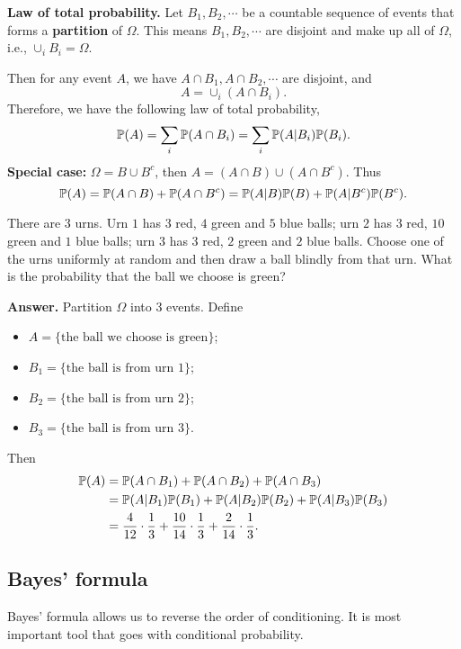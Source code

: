   
  \textbf{Law of total probability.} Let $B_1, B_2,\cdots$ be a countable
  sequence of events that forms a \textbf{partition} of $\Omega$. This means
  $B_1,B_2,\cdots$ are disjoint and make up all of $\Omega$, i.e., $\cup_iB_i = \Omega$.

  Then for any event $A$, we have $A\cap B_1, A\cap B_2,\cdots$ are disjoint,
  and
  \[
    A = \cup_i(A\cap B_i).
  \]
  Therefore, we have the following law of total probability,
  \[
    \mathbb{P}(A) = \sum_i \mathbb{P}(A\cap B_i) = \sum_i \mathbb{P}(A| B_i) \mathbb{P}(B_i).
  \]
  \textbf{Special case:} $\Omega = B\cup B^c$, then $A = (A\cap B) \cup (A\cap
  B^c)$. Thus
  \[
    \mathbb{P}(A) = \mathbb{P}(A\cap B) + \mathbb{P}(A\cap B^c) = \mathbb{P}(A|B)\mathbb{P}(B) + \mathbb{P}(A|B^c)\mathbb{P}(B^c).
  \]
  \begin{example}
    There are $3$ urns. Urn $1$ has $3$ red, $4$ green and $5$ blue balls; urn
    $2$ has $3$ red, $10$ green and $1$ blue balls; urn $3$ has $3$ red, $2$
    green and $2$ blue balls. Choose one of the urns uniformly at random and
    then draw a ball blindly from that urn. What is the probability that the
    ball we choose is green?
  \end{example}
  \textbf{Answer.} Partition $\Omega$ into $3$ events. Define
  \begin{itemize}
  \item $A = \{\text{the ball we choose is green}\}$;
  \item $B_1 = \{\text{the ball is from urn $1$}\}$;
  \item $B_2 = \{\text{the ball is from urn $2$}\}$;
  \item $B_3 = \{\text{the ball is from urn $3$}\}$.
  \end{itemize}
  Then
  \begin{align*}
    \mathbb{P}(A) & = \mathbb{P}(A\cap B_1) + \mathbb{P}(A\cap B_2) + \mathbb{P}(A\cap B_3)\\
           & = \mathbb{P}(A|B_1)\mathbb{P}(B_1) + \mathbb{P}(A|B_2)\mathbb{P}(B_2) + \mathbb{P}(A|B_3)\mathbb{P}(B_3)\\
           & = \frac{4}{12}\cdot \frac{1}{3}+\frac{10}{14}\cdot \frac{1}{3}+ \frac{2}{14}\cdot \frac{1}{3}.
  \end{align*}
\subsection{Bayes' formula}
\label{subsec:bayes}
Bayes' formula allows us to reverse the order of conditioning. It is most
important tool that goes with conditional probability.

